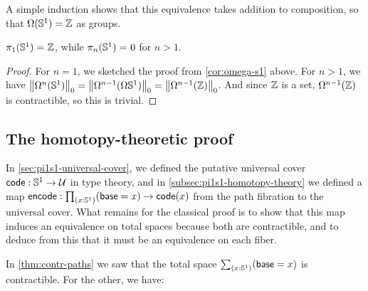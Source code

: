 A simple induction shows that this equivalence takes addition to
composition, so that $\Omega(\Sn ^1) = \Z$ as groups.

\begin{cor} \label{cor:pi1s1}
$\id{\pi_1(\Sn ^1)} {\Z}$, while $\id{\pi_n(\Sn ^1)}0$ for $n>1$.
\end{cor}
\begin{proof}
For $n=1$, we sketched the proof from \autoref{cor:omega-s1} above.
For $n > 1$, we have $\trunc 0 {\Omega^{n}(\Sn ^1)} = \trunc 0 {\Omega^{n-1}(\Omega{\Sn ^1})} = \trunc 0 {\Omega^{n-1}(\Z)}$.
And since $\Z$ is a set, $\Omega^{n-1}(\Z)$ is contractible, so this is trivial.
\end{proof}

%


\subsection{The homotopy-theoretic proof}
\label{subsec:pi1s1-homotopy-theory}

In \autoref{sec:pi1s1-universal-cover}, we defined the putative universal cover $\code:\Sn^1\to\type$ in type theory, and in \autoref{subsec:pi1s1-homotopy-theory} we defined a map $\encode : \prd{x:\Sn^1} (\base=x) \to \code(x)$ from the path fibration to the universal cover.
What remains for the classical proof is to show that this map induces an equivalence on total spaces because both are contractible, and to deduce from this that it must be an equivalence on each fiber.

%
In \autoref{thm:contr-paths} we saw that the total space $\sm{x:\Sn^1} (\base=x)$ is contractible.
For the other, we have:

